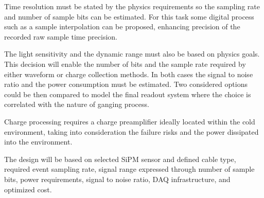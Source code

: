Time resolution must be stated by the physics requirements so the sampling rate and number of sample bits can be estimated. For this task 
some digital process such as a sample interpolation can be proposed, enhancing precision of the recorded raw sample time precision.

The light sensitivity and the dynamic range must also be based on physics goals. This decision will enable the number of bits and the sample 
rate required by either waveform or charge collection methods. In both cases the signal to noise ratio and the power consumption must be estimated. 
Two considered options could be then compared to model the final readout system where the choice is  correlated with the nature of ganging process. 


Charge processing requires a charge preamplifier ideally located within the cold environment, taking into consideration the failure risks and the power 
dissipated into the environment.

The design will be based on selected SiPM sensor and defined cable type, required event sampling rate, signal range expressed 
through number of sample bits, power requirements, signal to noise ratio, DAQ infrastructure, and optimized cost.


